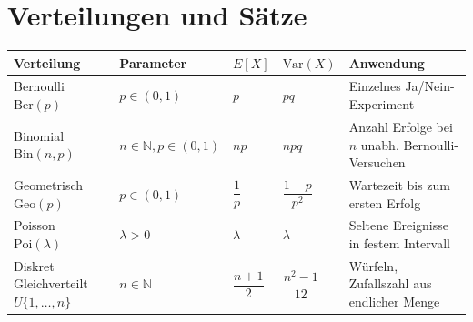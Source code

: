 \section{Verteilungen und Sätze}

\begin{mytable}
    \begin{tabular}{|l|l|l|l|p{5cm}|}
        \hline
        \textbf{Verteilung} & \textbf{Parameter} & $E[X]$ & $\text{Var}(X)$ & \textbf{Anwendung} \\
        \hline
        Bernoulli $\text{Ber}(p)$ & $p \in (0,1)$ & $p$ & $pq$ & Einzelnes Ja/Nein-Experiment \\
        \hline
        Binomial $\text{Bin}(n,p)$ & $n \in \mathbb{N}, p \in (0,1)$ & $np$ & $npq$ & Anzahl Erfolge bei $n$ unabh. Bernoulli-Versuchen \\
        \hline
        Geometrisch $\text{Geo}(p)$ & $p \in (0,1)$ & $\dfrac{1}{p}$ & $\dfrac{1-p}{p^2}$ & Wartezeit bis zum ersten Erfolg \\
        \hline
        Poisson $\text{Poi}(\lambda)$ & $\lambda > 0$ & $\lambda$ & $\lambda$ & Seltene Ereignisse in festem Intervall \\
        \hline
        Diskret Gleichverteilt $U\{1,\dots,n\}$ & $n \in \mathbb{N}$ & $\dfrac{n+1}{2}$ & $\dfrac{n^2-1}{12}$ &
        Würfeln, Zufallszahl aus endlicher Menge %
    \end{tabular}
    \caption{Diskrete Verteilungen}
\end{mytable}




